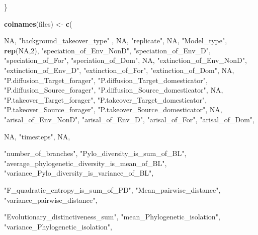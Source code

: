 \documentclass[]{book}
\newenvironment{Shaded}{\begin{snugshade}}{\end{snugshade}}
\newcommand{\KeywordTok}[1]{\textcolor[rgb]{0.13,0.29,0.53}{\textbf{{#1}}}}
\newcommand{\DecValTok}[1]{\textcolor[rgb]{0.00,0.00,0.81}{{#1}}}
\newcommand{\StringTok}[1]{\textcolor[rgb]{0.31,0.60,0.02}{{#1}}}
\newcommand{\OtherTok}[1]{\textcolor[rgb]{0.56,0.35,0.01}{{#1}}}
\newcommand{\NormalTok}[1]{{#1}}
\theoremstyle{definition}
\theoremstyle{definition}
\theoremstyle{remark}
\begin{document}
\begin{Shaded}
\begin{Highlighting}[]
\NormalTok{\}}


\KeywordTok{colnames}\NormalTok{(files) <-}\StringTok{  }\KeywordTok{c}\NormalTok{(}

    \OtherTok{NA}\NormalTok{,}
    \StringTok{"background_takeover_type"}\NormalTok{ ,}
    \OtherTok{NA}\NormalTok{,}
    \StringTok{"replicate"}\NormalTok{,}
    \OtherTok{NA}\NormalTok{,}
    \StringTok{"Model_type"}\NormalTok{,}
    \KeywordTok{rep}\NormalTok{(}\OtherTok{NA}\NormalTok{,}\DecValTok{2}\NormalTok{),}
    \StringTok{"speciation_of_Env_NonD"}\NormalTok{,}
    \StringTok{"speciation_of_Env_D"}\NormalTok{,}
    \StringTok{"speciation_of_For"}\NormalTok{,}
    \StringTok{"speciation_of_Dom"}\NormalTok{,}
    \OtherTok{NA}\NormalTok{,}
    \StringTok{"extinction_of_Env_NonD"}\NormalTok{,}
    \StringTok{"extinction_of_Env_D"}\NormalTok{,}
    \StringTok{"extinction_of_For"}\NormalTok{,}
    \StringTok{"extinction_of_Dom"}\NormalTok{,}
    \OtherTok{NA}\NormalTok{,}
    \StringTok{"P.diffusion_Target_forager"}\NormalTok{,}
    \StringTok{"P.diffusion_Target_domesticator"}\NormalTok{,}
    \StringTok{"P.diffusion_Source_forager"}\NormalTok{,}
    \StringTok{"P.diffusion_Source_domesticator"}\NormalTok{,}
    \OtherTok{NA}\NormalTok{,}
    \StringTok{"P.takeover_Target_forager"}\NormalTok{,}
    \StringTok{"P.takeover_Target_domesticator"}\NormalTok{,}
    \StringTok{"P.takeover_Source_forager"}\NormalTok{,}
    \StringTok{"P.takeover_Source_domesticator"}\NormalTok{,}
    \OtherTok{NA}\NormalTok{,}
    \StringTok{"arisal_of_Env_NonD"}\NormalTok{,}
    \StringTok{"arisal_of_Env_D"}\NormalTok{,}
    \StringTok{"arisal_of_For"}\NormalTok{,}
    \StringTok{"arisal_of_Dom"}\NormalTok{,}
    
    \OtherTok{NA}\NormalTok{, }
    \StringTok{"timesteps"}\NormalTok{, }
    \OtherTok{NA}\NormalTok{,}
        
    \StringTok{"number_of_branches"}\NormalTok{,}
    \StringTok{"Pylo_diversity_is_sum_of_BL"}\NormalTok{,}
    \StringTok{"average_phylogenetic_diversity_is_mean_of_BL"}\NormalTok{,}
    \StringTok{"variance_Pylo_diversity_is_variance_of_BL"}\NormalTok{,}

    \StringTok{"F_quadratic_entropy_is_sum_of_PD"}\NormalTok{,}
    \StringTok{"Mean_pairwise_distance"}\NormalTok{,}
    \StringTok{"variance_pairwise_distance"}\NormalTok{,}

    \StringTok{"Evolutionary_distinctiveness_sum"}\NormalTok{,}
    \StringTok{"mean_Phylogenetic_isolation"}\NormalTok{,}
    \StringTok{"variance_Phylogenetic_isolation"}\NormalTok{,}


\end{Highlighting}
\end{Shaded}
\end{document}
